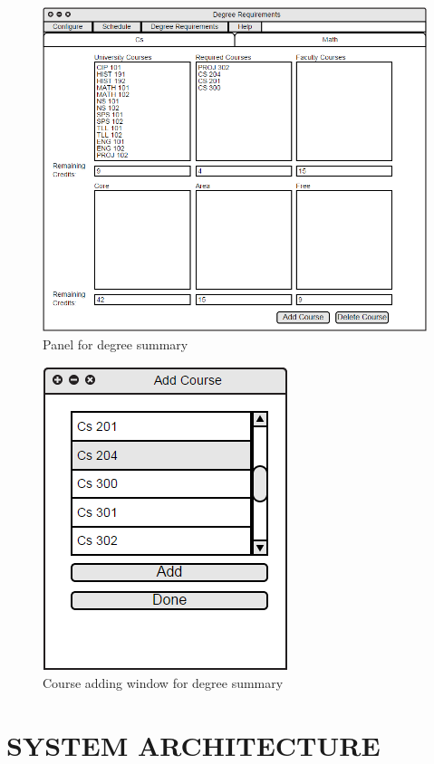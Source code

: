 \documentclass[twoside,letterpaper]{article}
\begin{document}
\begin{figure}[h!]
\centering
\includegraphics[keepaspectratio, scale=0.65]{Mockups/degree.png}
\caption{Panel for degree summary}
\label{fig:mockupDegree}
\end{figure}

\begin{figure}[h!]
\centering
\includegraphics[keepaspectratio, scale=0.6]{Mockups/addCourseDegree.png}
\caption{Course adding window for degree summary}
\label{fig:mockupAddDegree}
\end{figure}

\clearpage\section[SYSTEM ARCHITECTURE]{\rmfamily\bfseries\color{black}
SYSTEM ARCHITECTURE}
\end{document}
